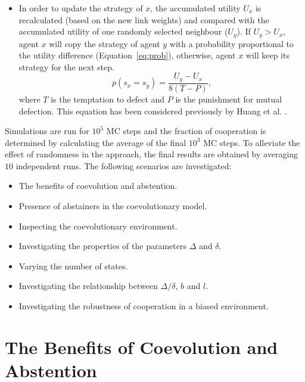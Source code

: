 \documentclass{llncs}
\begin{document}
\begin{itemize}
    \item In order to update the strategy of $x$, the accumulated utility $U_x$
        is recalculated (based on the new link weights) and compared with the
        accumulated utility of one randomly selected neighbour ($U_y$).
        If $U_y>U_x$, agent $x$ will copy the strategy of agent $y$ with a
        probability proportional to the utility difference
        (Equation~\ref{eq:prob}), otherwise, agent $x$ will keep its strategy
        for the next step.
        \begin{equation}
            \label{eq:prob}
            p(s_x=s_y) = \frac{U_y-U_x}{8(T-P)},
        \end{equation}
        where $T$ is the temptation to defect and $P$ is the punishment for
        mutual defection. This equation has been considered previously by
        Huang et al. \cite{Huang2015}.
\end{itemize}

Simulations are run for $10^5$ MC steps and the fraction of cooperation is
determined by calculating the average of the final $10^3$ MC steps. To alleviate
the effect of randomness in the approach, the final results are obtained by
averaging $10$ independent runs.
The following scenarios are investigated:
\begin{itemize}

    \item The benefits of coevolution and abstention.

    \item Presence of abstainers in the coevolutionary model.

    \item Inspecting the coevolutionary environment.

    \item Investigating the properties of the parameters $\Delta$ and $\delta$.

    \item Varying the number of states.

    \item Investigating the relationship between $\Delta/\delta$, $b$ and $l$.

    \item Investigating the robustness of cooperation in a biased environment.

\end{itemize}


\section{The Benefits of Coevolution and Abstention}
\label{sec:results1}
\end{document}
